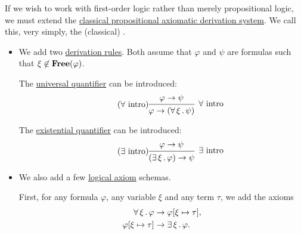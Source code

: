 \begin{definition}\label{def:first_order_derivation_system}
  If we wish to work with first-order logic rather than merely propositional logic, we must extend the \hyperref[def:propositional_axiomatic_derivation_system]{classical propositional axiomatic derivation system}. We call this, very simply, the (classical) .

  \begin{itemize}
    \item{} We add two \hyperref[def:first_order_derivation_system/rules]{derivation rules}. Both assume that \( \varphi \) and \( \psi \) are formulas such that \( \xi \not\in \operatorname{\mathbf{Free}}(\varphi) \).

    \begin{thmenum}[series=def:first_order_derivation_system]
       The \hyperref[def:first_order_language/quantifiers/universal]{universal quantifier} can be introduced:
      \begin{equation}\label{eq:def:first_order_derivation_system/rules/forall_intro}
        \tag{\( \forall \) intro}
        \begin{prooftree}
          \hypo{\varphi \rightarrow \psi}
          \infer1[\( \forall \) intro]{\varphi \rightarrow (\qforall \xi \psi)}
        \end{prooftree}
      \end{equation}

       The \hyperref[def:first_order_language/quantifiers/existential]{existential quantifier} can be introduced:
      \begin{equation}\label{eq:def:first_order_derivation_system/rules/exists_intro}
        \tag{\( \exists \) intro}
        \begin{prooftree}
          \hypo{\varphi \rightarrow \psi}
          \infer1[\( \exists \) intro]{(\qexists \xi \varphi) \rightarrow \psi}
        \end{prooftree}
      \end{equation}
    \end{thmenum}

    \item We also add a few \hyperref[def:first_order_derivation_system/axioms]{logical axiom} schemas.

    \begin{thmenum}[resume=def:first_order_derivation_system]
       First, for any formula \( \varphi \), any variable \( \xi \) and any term \( \tau \), we add the axioms
      \begin{align}
        \forall \thinspace \xi \thinspace . \thinspace \varphi      &\rightarrow \varphi[\xi \mapsto \tau], \label{eq:def:first_order_derivation_system/axioms/terms/forall_elim} \\
        \varphi[\xi \mapsto \tau] &\rightarrow \exists \thinspace \xi \thinspace . \thinspace \varphi.      \label{eq:def:first_order_derivation_system/axioms/terms/exists_intro}
      \end{align}


\end{thmenum}
\end{itemize}
\end{definition}

